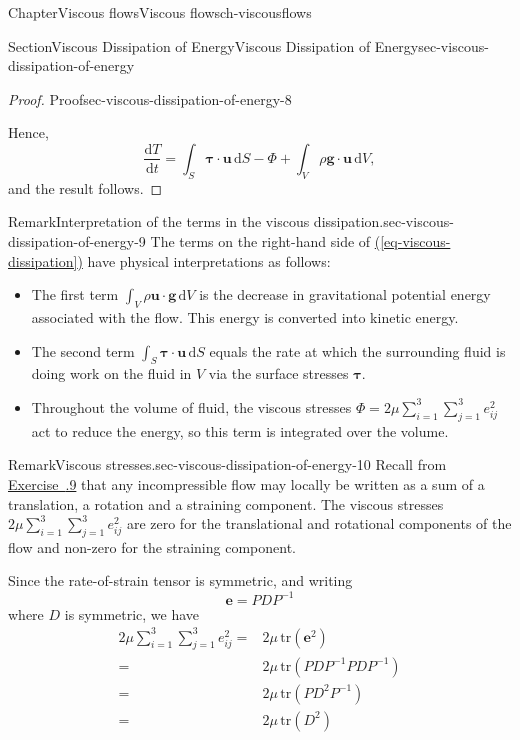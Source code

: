 \documentclass[oneside,10pt,]{book}
\newcommand{\xreffont}{\relax}
\newcommand{\ptxlistdisc}{\raisebox{0.3ex}{\textbullet}}
\numberwithin{equation}{section}
\newcommand{\de}{\mathrm{d}}
\newcommand{\dd}[2]{\frac{\de#1}{\de#2}}
\newcommand{\be}{\boldsymbol{e}}
\newcommand{\bu}{\boldsymbol{u}}
\newcommand{\bg}{\boldsymbol{g}}
\newcommand{\btau}{\boldsymbol{\tau}}
\begin{document}
\begin{chapterptx}{Chapter}{Viscous flows}{}{Viscous flows}{}{}{ch-viscousflows}
\begin{sectionptx}{Section}{Viscous Dissipation of Energy}{}{Viscous Dissipation of Energy}{}{}{sec-viscous-dissipation-of-energy}
\begin{proof}{Proof}{}{sec-viscous-dissipation-of-energy-8}
\par
Hence,%
\begin{equation*}
\dd{T}{t}=\int_S\btau\cdot\bu\,\de S-\Phi+\int_V\rho\bg\cdot\bu\,\de V,
\end{equation*}
and the result follows.%
\end{proof}
\begin{remark}{Remark}{Interpretation of the terms in the viscous dissipation.}{sec-viscous-dissipation-of-energy-9}%
The terms on the right-hand side of \hyperref[eq-viscous-dissipation]{({\xreffont\ref{eq-viscous-dissipation}})} have physical interpretations as follows:%
\begin{itemize}[label=\ptxlistdisc]
\item{}The first term \(\int_V\rho\bu\cdot\bg\,\de V\) is the decrease in gravitational potential energy associated with the flow. This energy is converted into kinetic energy.%
\item{}The second term \(\int_S\btau\cdot\bu\,\de S\) equals the rate at which the surrounding fluid is doing work on the fluid in \(V\) via the surface stresses \(\btau\).%
\item{}Throughout the volume of fluid, the viscous stresses \(\Phi=2\mu\sum_{i=1}^3\sum_{j=1}^3e_{ij}^2\) act to reduce the energy, so this term is integrated over the volume.%
\end{itemize}
%
\end{remark}
\begin{remark}{Remark}{Viscous stresses.}{sec-viscous-dissipation-of-energy-10}%
Recall from \hyperlink{exercise-velocity-decomposition}{Exercise~{\xreffont 6.9.9}} that any incompressible flow may locally be written as a sum of a translation, a rotation and a straining component. The viscous stresses \(2\mu\sum_{i=1}^3\sum_{j=1}^3e_{ij}^2\) are zero for the translational and rotational components of the flow and non-zero for the straining component.%
\par
Since the rate-of-strain tensor is symmetric, and writing%
\begin{equation*}
\be=PDP^{-1}
\end{equation*}
where \(D\) is symmetric, we have%
\begin{align*}
2\mu\sum_{i=1}^3\sum_{j=1}^3e_{ij}^2
=&2\mu\,\mathrm{tr}\left(\be^2\right)\\
=&2\mu\,\mathrm{tr}\left(PDP^{-1}PDP^{-1}\right)\\
=&2\mu\,\mathrm{tr}\left(PD^2P^{-1}\right)\\
=&2\mu\,\mathrm{tr}\left(D^2\right)\\

\end{align*}
\end{remark}
\end{sectionptx}
\end{chapterptx}
\end{document}
